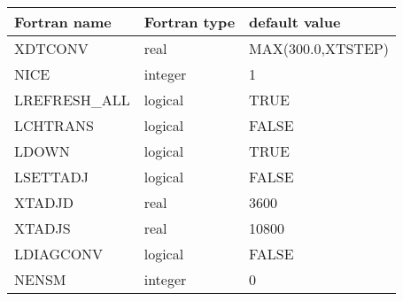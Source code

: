 \begin{center}
\begin{tabular} {|l|l|l|}
\hline
Fortran name & Fortran type & default value \\
\hline
XDTCONV      &  real         & MAX(300.0,XTSTEP) \\
NICE         &  integer      &   1               \\
LREFRESH\_ALL&  logical      &   TRUE            \\
LCHTRANS     &  logical      &   FALSE           \\
LDOWN        &  logical      &   TRUE            \\
LSETTADJ     &  logical      &   FALSE           \\
XTADJD       &  real         &   3600            \\
XTADJS       &  real         &  10800            \\
LDIAGCONV    &  logical      &   FALSE           \\
NENSM        &  integer      &     0             \\
\hline
\end{tabular}
\end{center}

